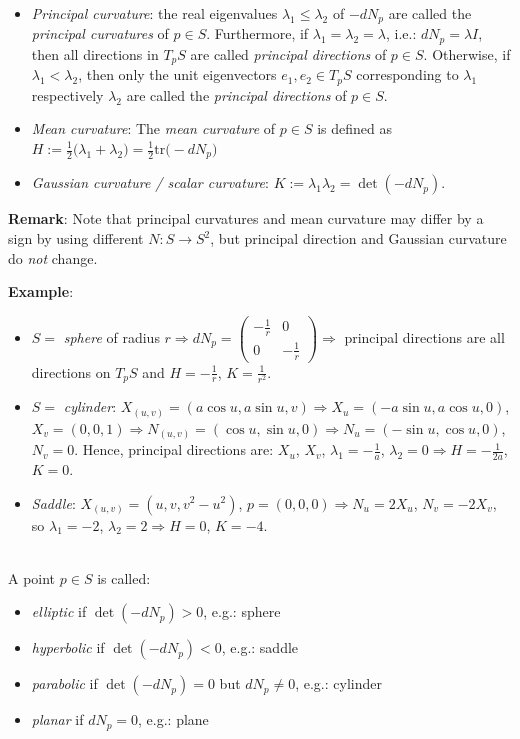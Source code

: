 \begin{itemize}
\item \textit{Principal curvature}: the real eigenvalues $\lambda_1\le\lambda_2$ of $-dN_p$ are called the \textit{principal curvatures} of $p\in S$. Furthermore, if $\lambda_1 = \lambda_2 = \lambda$, i.e.: $dN_p = \lambda I$, then all directions in $T_pS$ are called \textit{principal directions} of $p\in S$. Otherwise, if $\lambda_1 < \lambda_2$, then only the unit eigenvectors $e_1, e_2\in T_pS$ corresponding to $\lambda_1$ respectively $\lambda_2$ are called the \textit{principal directions} of $p\in S$.
\item \textit{Mean curvature}: The \textit{mean curvature} of $p\in S$ is defined as $H := \frac{1}{2}\big(\lambda_1 + \lambda_2\big) = \frac{1}{2}\mathrm{tr}\big(-dN_p\big)$
\item \textit{Gaussian curvature / scalar curvature}: $K := \lambda_1\lambda_2 = \det(-dN_p)$.
\end{itemize}

\noindent\textbf{Remark}: Note that principal curvatures and mean curvature may differ by a sign by using different $N: S\to S^2$, but principal direction and Gaussian curvature do \textit{not} change.

\noindent\textbf{Example}:\begin{itemize}
\item $S = $ \textit{sphere} of radius $r \Rightarrow dN_p = \begin{pmatrix}-\frac{1}{r} & 0\\ 0 & -\frac{1}{r}\end{pmatrix} \Rightarrow$ principal directions are all directions on $T_pS$ and $H = -\frac{1}{r}$, $K = \frac{1}{r^2}$.
\item $S = $ \textit{cylinder}: $X_{(u, v)} = (a\cos u, a\sin u, v) \Rightarrow X_u = (-a\sin u, a\cos u, 0)$, $X_v = (0, 0, 1) \Rightarrow N_{(u, v)} = (\cos u, \sin u, 0) \Rightarrow N_u = (-\sin u, \cos u, 0)$, $N_v = 0$. Hence, principal directions are: $X_u$, $X_v$, $\lambda_1 = -\frac{1}{a}$, $\lambda_2 = 0 \Rightarrow H = -\frac{1}{2a}$, $K = 0$.
\item \textit{Saddle}: $X_{(u, v)} = (u, v, v^2 - u^2)$, $p = (0, 0, 0) \Rightarrow N_u = 2X_u$, $N_v = -2X_v$, so $\lambda_1 = -2$, $\lambda_2 = 2 \Rightarrow H = 0$, $K = -4$.
\end{itemize}

\\
A point $p\in S$ is called:
\begin{itemize}
\item \textit{elliptic} if $\det(-dN_p) > 0$, e.g.: sphere
\item \textit{hyperbolic} if $\det(-dN_p) < 0$, e.g.: saddle
\item \textit{parabolic} if $\det(-dN_p) = 0$ but $dN_p\neq 0$, e.g.: cylinder
\item \textit{planar} if $dN_p = 0$, e.g.: plane
\end{itemize}

